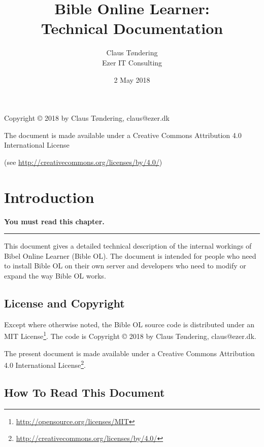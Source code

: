 \documentclass[11pt,oneside,a4paper]{memoir}
\title{Bible Online Learner:\\Technical Documentation}
\author{Claus Tøndering\\Ezer IT Consulting}
\date{2 May 2018}
\begin{document}
\begin{titlingpage*}
\maketitle

\begin{center}
Copyright © 2018 by Claus Tøndering, claus@ezer.dk

\vspace{5mm}

The document is made available under a Creative Commons Attribution 4.0 International License

(see \url{http://creativecommons.org/licenses/by/4.0/})
\end{center}
\end{titlingpage*}


\clearpage
\tableofcontents
{} %

\chapter{Introduction}

\textbf{You must read this chapter.}
\plainbreak{3}

This document gives a detailed technical description of the internal workings of Bibel Online
Learner (Bible OL). The document is intended for people who need to install Bible OL on their own
server and developers who need to modify or expand the way Bible OL works.

\section{License and Copyright}

Except where otherwise noted, the Bible OL source code is distributed under an MIT
License\footnote{\url{http://opensource.org/licenses/MIT}}. The code is Copyright © 2018 by Claus
Tøndering, claus@ezer.dk.

The present document is made available under a Creative Commons Attribution 4.0 International
License\footnote{\url{http://creativecommons.org/licenses/by/4.0/}}.


\section{How To Read This Document}
\end{document}
